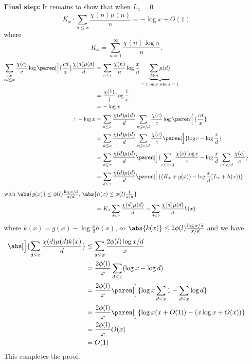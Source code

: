 \textbf{Final step:} It remains to show that when $L_x=0$
\[ K_x\cdot\sum_{n\leq x}\frac{\chi(n)\mu(n)}{n} = -\log x + O(1) \]
where
\[ K_x = \sum_{n=1}^\infty \frac{\chi(n)\log n}{n} . \]
\begin{align*}
\sum_{\substack{c,d\\cd\leq x}}\frac{\chi(c)}{c}\log\paren[\Big]{\frac{cd}{x}}\frac{\chi(d)\mu(d)}{d} &= \sum_{n\leq x}\frac{\chi(n)}{n}\log\frac xn \underbrace{\sum_{d\div n}\mu(d)}_{\text{$=1$ only when $=1$}} \\
&= \frac{\chi(1)}{1}\log\frac1x \\
&= -\log x \\
\therefore -\log x &= \sum_{d\leq x}\frac{\chi(d)\mu(d)}{d}\sum_{c\leq x/d}\frac{\chi(c)}{c}\log\paren[\Big]{\frac{cd}{x}} \\
&= \sum_{d\leq x}\frac{\chi(d)\mu(d)}{d}\sum_{c\leq x/d}\frac{\chi(c)}{c}\paren[\Big]{\log c-\log\frac xd} \\
&= \sum_{d\leq x}\frac{\chi(d)\mu(d)}{d}\paren[\Big]{\sum_{c\leq x/d}\frac{\chi(c)\log c}{c}-\log\frac xd\sum_{c\leq x/d}\frac{\chi(c)}{c}} \\
&= \sum_{d\leq x}\frac{\chi(d)\mu(d)}{d}\paren[\Big]{(K_x+g(x))-\log\frac xd(L_x+h(x))} \\ \intertext{with $\abs{g(x)}\leq\phi(l)\frac{\log x/d}{x/d}$, $\abs{h(x)\leq\phi(l)\frac{1}{x/d}}$}
&= K_x \sum_{d\leq x}\frac{\chi(d)\mu(d)}{d} + \sum_{d\leq x}\frac{\chi(d)\mu(d)}{d}k(x)
\end{align*}
where $k(x)=g(x)-\log\frac xd h(x)$, so $\abs{k(x)}\leq 2\phi(l)\frac{\log x/d}{x/d}$ and we have
\begin{align*}
\abs[\Big]{\sum_{d\leq x}\frac{\chi(d)\mu(d)k(x)}{d}} &\leq \sum_{d\leq x}\frac{2\phi(l)\log x/d}{x} \\
&= \frac{2\phi(l)}{x}\sum_{d\leq x}(\log x-\log d) \\
&= \frac{2\phi(l)}{x}\paren[\Big]{\log x\sum_{d\leq x}1-\sum_{d\leq x}\log d} \\
&= \frac{2\phi(l)}{x}\paren[\Big]{\log x(x+O(1))-(x\log x+O(x))} \\
&= \frac{2\phi(l)}{x}O(x) \\
&= O(1)
\end{align*}
This completes the proof.

